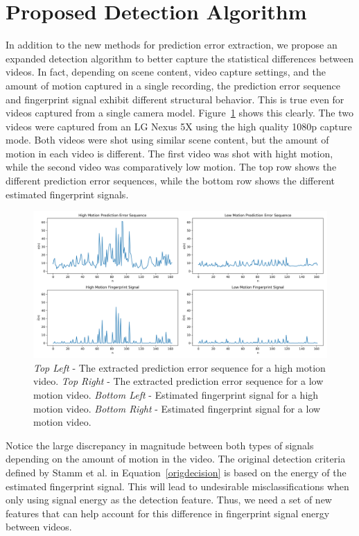 \section{Proposed Detection Algorithm}

In addition to the new methods for prediction error extraction, we propose an expanded detection algorithm to better capture the statistical differences between videos. In fact, depending on scene content, video capture settings, and the amount of motion captured in a single recording, the prediction error sequence and fingerprint signal exhibit different structural behavior. This is true even for videos captured from a single camera model. Figure~\ref{seqCompare} shows this clearly. The two videos were captured from an LG Nexus 5X using the high quality 1080p capture mode. Both videos were shot using similar scene content, but the amount of motion in each video is different. The first video was shot with hight motion, while the second video was comparatively low motion. The top row shows the different prediction error sequences, while the bottom row shows the different estimated fingerprint signals.

\begin{figure}[htbp]
\centerline{\includegraphics[width=0.9\linewidth]{ProposedApproach/perror_seq_comparisons.png}}
\caption{\emph{Top Left} - The extracted prediction error sequence for a high motion video. \emph{Top Right} - The extracted prediction error sequence for a low motion video. \emph{Bottom Left} - Estimated fingerprint signal for a high motion video. \emph{Bottom Right} - Estimated fingerprint signal for a low motion video.}
\label{seqCompare}
\end{figure}

Notice the large discrepancy in magnitude between both types of signals depending on the amount of motion in the video. The original detection criteria defined by Stamm et al. in Equation~\ref{origdecision} is based on the energy of the estimated fingerprint signal. This will lead to undesirable misclassifications when only using signal energy as the detection feature. Thus, we need a set of new features that can help account for this difference in fingerprint signal energy between videos. 

